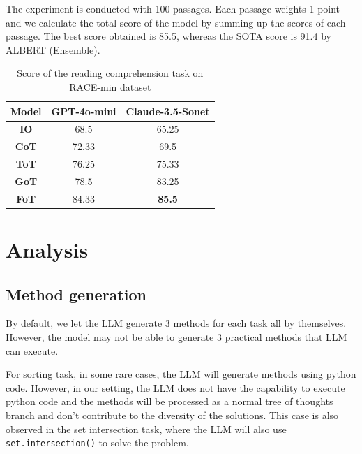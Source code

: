 \documentclass{article}
\begin{document}
The experiment is conducted with 100 passages. Each passage weights 1 point and we calculate the total score of the model by summing up the scores of each passage. The best score obtained is 85.5, whereas the SOTA score is 91.4 by ALBERT (Ensemble)\cite{jiang2020improvingmachinereadingcomprehension}.

\begin{table}[h]
    \centering
    \begin{tabular}{|c|c|c|}
        \hline
        \textbf{Model} & \textbf{GPT-4o-mini} & \textbf{Claude-3.5-Sonet} \\
        \hline \hline
        \textbf{IO}    & 68.5                 & 65.25                    \\
        \textbf{CoT}   & 72.33                & 69.5                     \\
        \textbf{ToT}   & 76.25                & 75.33                    \\
        \textbf{GoT}   & 78.5                 & 83.25                    \\
        \textbf{FoT}   & 84.33                & \textbf{85.5}                     \\
        \hline
    \end{tabular}
    \vspace{1em}
    \caption{Score of the reading comprehension task on RACE-min dataset}
    \label{tab:reading_comprehension_results}
\end{table}

\section{Analysis}

\subsection{Method generation}

By default, we let the LLM generate 3 methods for each task all by themselves. However, the model may not be able to generate 3 practical methods that LLM can execute. 

For sorting task, in some rare cases, the LLM will generate methods using python code. However, in our setting, the LLM does not have the capability to execute python code and the methods will be processed as a normal tree of thoughts branch and don't contribute to the diversity of the solutions. This case is also observed in the set intersection task, where the LLM will also use \texttt{set.intersection()} to solve the problem.
\end{document}
